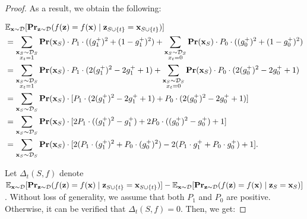 \documentclass{article}
\newcommand{\z}{\textbf{z}}
\newcommand{\x}{\textbf{x}}
\newcommand{\fml}[1]{{\mathcal{#1}}}
\newcommand{\mbf}[1]{\ensuremath\mathbf{#1}}
\newcommand{\mbb}[1]{\ensuremath\mathbb{#1}}
\begin{document}
\begin{proof}
As a result, we obtain the following:


\begin{equation}
\begin{aligned}
&\mbb{E}_{\x\sim \mathcal{D}}[\mbf{Pr}_{\z\sim \mathcal{D}}(f(\z) = f(\x) \mid \z_{S\cup\{t\}} = \x_{S\cup\{t\}})] \\
&= \sum_{\substack{\x_{S} \sim \fml{D}_{S} \\ x_t = 1}} \mbf{Pr}(\x_{S}) \cdot P_{1} \cdot ((g_{1}^{+})^2 + (1-g_{1}^{+})^2)
+ \sum_{\substack{\x_{S} \sim \fml{D}_{S} \\ x_t = 0}} \mbf{Pr}(\x_{S}) \cdot P_{0} \cdot ((g_{0}^{+})^2 + (1 - g_{0}^{+})^2) \\
&= \sum_{\substack{\x_{S} \sim \fml{D}_{S} \\ x_t = 1}} \mbf{Pr}(\x_{S}) \cdot P_{1} \cdot (2(g_{1}^{+})^2 - 2g_{1}^{+} + 1)
+ \sum_{\substack{\x_{S} \sim \fml{D}_{S} \\ x_t = 0}} \mbf{Pr}(\x_{S}) \cdot P_{0} \cdot (2(g_{0}^{+})^2 - 2g_{0}^{+} + 1) \\
&= \sum_{\x_{S} \sim \fml{D}_{S}} \mbf{Pr}(\x_{S}) \cdot [P_{1} \cdot (2(g_{1}^{+})^2 - 2g_{1}^{+} + 1) + P_{0} \cdot (2(g_{0}^{+})^2 - 2g_{0}^{+} + 1)] \\
&= \sum_{\x_{S} \sim \fml{D}_{S}} \mbf{Pr}(\x_{S}) \cdot [2P_{1} \cdot ((g_{1}^{+})^2 - g_{1}^{+}) + 2P_{0} \cdot ((g_{0}^{+})^2 - g_{0}^{+}) + 1] \\
&= \sum_{\x_{S} \sim \fml{D}_{S}} \mbf{Pr}(\x_{S}) \cdot [2(P_{1} \cdot (g_{1}^{+})^2 + P_{0} \cdot (g_{0}^{+})^2) - 2(P_{1} \cdot g_{1}^{+} + P_{0} \cdot g_{0}^{+}) + 1].
\end{aligned}
\end{equation}


Let $\Delta_{t}(S,f)$ denote
$\mbb{E}_{\x\sim \mathcal{D}}[\mbf{Pr}_{\z\sim \mathcal{D}}(f(\z) = f(\x) \mid \z_{S\cup\{t\}} = \x_{S\cup\{t\}})] - \mbb{E}_{\x\sim \mathcal{D}}[\mbf{Pr}_{\z\sim \mathcal{D}}(f(\z) = f(\x) \mid \z_{S} = \x_{S})]$.
Without loss of generality, we assume that both $P_{1}$ and $P_{0}$ are positive.
Otherwise, it can be verified that $\Delta_{t}(S,f) = 0$.
Then, we get:



\end{proof}
\end{document}
